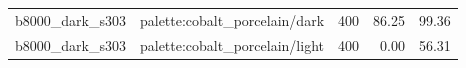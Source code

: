 \begin{longtable}{l>{\raggedright\arraybackslash}p{.42\linewidth}rrr}
b8000\_\allowbreak{}dark\_\allowbreak{}s303 & %
palette:cobalt\_\allowbreak{}porcelain/dark & %
400 & %
86.25 & %
99.36 \\ %

b8000\_\allowbreak{}dark\_\allowbreak{}s303 & %
palette:cobalt\_\allowbreak{}porcelain/light & %
400 & %
0.00 & %
56.31 \\ %


\end{longtable}
